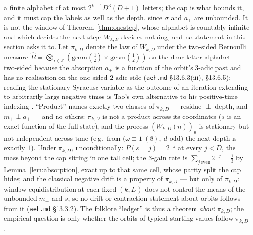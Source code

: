 \documentclass[11pt]{article}
\theoremstyle{remark}
\newcommand{\Z}{\mathbb{Z}}
\newcommand{\w}{\omega}
\begin{document}
a finite alphabet of at most $2^{k+1}D^3(D+1)$ letters; the cap is what bounds it, and it must cap the labels as well as the depth, since $\sigma$ and $a_+$ are unbounded. It is not the window of Theorem~\ref{thm:onestep}, whose alphabet is countably infinite and which decides the next step: $W_{k,D}$ decides nothing, and no statement in this section asks it to. Let $\pi_{k,D}$ denote the law of $W_{k,D}$ under the two-sided Bernoulli measure $\hat B = \bigotimes_{i \in \Z}(\mathrm{geom}(\tfrac12) \times \mathrm{geom}(\tfrac12))$ on the door-letter alphabet --- two-sided because the absorption $a_+$ is a function of the orbit's $3$-adic past and has no realisation on the one-sided $2$-adic side (\texttt{aeh.md} \S13.6.3(iii), \S13.6.5); reading the stationary Syracuse variable as the outcome of an iteration extending to arbitrarily large negative times is Tao's own alternative to his positive-time indexing \cite[Remark~1.13, footnote~4 of arXiv~v7]{tao}. ``Product'' names exactly two clauses of $\pi_{k,D}$ --- residue $\perp$ depth, and $m_+ \perp a_+$ --- and no others: $\pi_{k,D}$ is not a product across its coordinates ($s$ is an exact function of the full state), and the process $(W_{k,D}(n))_n$ is stationary but not independent across time (e.g.\ from $(\w \equiv 1\ (8),\ d$ odd$)$ the next depth is exactly $1$). Under $\pi_{k,D}$, unconditionally: $P(s = j) = 2^{-j}$ at every $j < D$, the mass beyond the cap sitting in one tail cell; the $3$-gain rate is $\sum_{j\,\mathrm{even}} 2^{-j} = \tfrac13$ by Lemma~\ref{lem:absorption}, exact up to that same cell, whose parity split the cap hides; and the classical negative drift is a property of $\pi_{k,D}$ --- but only of $\pi_{k,D}$: window equidistribution at each fixed $(k,D)$ does not control the means of the unbounded $m_+$ and $s$, so no drift or contraction statement about orbits follows from it (\texttt{aeh.md} \S13.3.2). The folklore ``ledger'' is thus a theorem \emph{about} $\pi_{k,D}$; the empirical question is only whether the orbits of typical starting values follow $\pi_{k,D}$.
\end{document}
